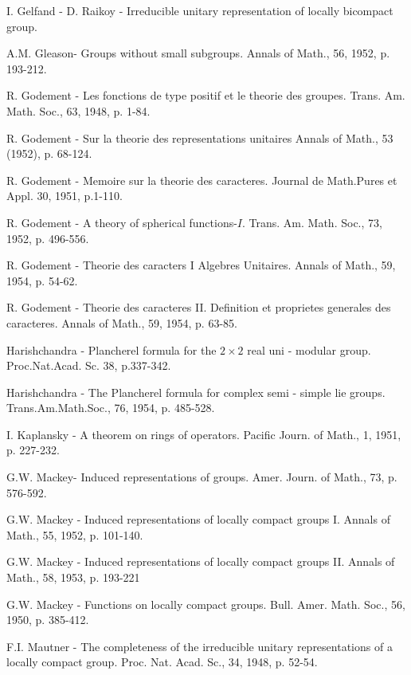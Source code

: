 \begin{thebibliography}{99}
 I. Gelfand - D. Raikoy -  Irreducible unitary representation
  of locally 
         bicompact group.

  A.M. Gleason\pageoriginale  -  Groups without small subgroups.
   Annals of Math., 56, 1952, p. 193-212.

  R. Godement  -  Les fonctions de type positif et le theorie
    des groupes.
   Trans. Am. Math. Soc., 63, 1948, p. 1-84.

 R. Godement -  Sur la theorie des representations unitaires
   Annals of Math., 53 (1952), p. 68-124.

 R. Godement -  Memoire sur la theorie des caracteres.
   Journal de Math.Pures et Appl.
  30, 1951, p.1-110.

 R. Godement -  A theory of spherical functions-$I$.
   Trans. Am. Math. Soc., 73, 1952, p. 496-556.

 R. Godement -  Theorie des caracters I Algebres Unitaires.
  Annals of Math., 59, 1954, p. 54-62.

 R. Godement -  Theorie des caracteres II. Definition et
  proprietes generales des caracteres.
  Annals of Math., 59, 1954, p. 63-85.

 Harishchandra -  Plancherel formula for the $2\times
  2$ real uni -  modular group.
    Proc.Nat.Acad. Sc. 38, p.337-342.

  Harishchandra -   The Plancherel formula for complex semi  - 
   simple lie groups.
   Trans.Am.Math.Soc., 76, 1954, p. 485-528.

 I. Kaplansky  -  A theorem on rings of operators.
    Pacific Journ. of Math., 1, 1951, p. 227-232.

 G.W. Mackey\pageoriginale  -  Induced representations
  of groups.  Amer. Journ. of Math., 73, p. 576-592.

 G.W. Mackey  -  Induced representations of locally compact
    groups I.
   Annals of Math., 55, 1952, p. 101-140.

 G.W. Mackey  -  Induced representations of locally compact
   groups II. Annals of Math., 58, 1953, p. 193-221

 G.W. Mackey -  Functions on locally compact groups.
   Bull. Amer. Math. Soc., 56, 1950, p. 385-412.

  F.I. Mautner  -  The completeness of the irreducible unitary
   representations of a locally compact group.
   Proc. Nat. Acad. Sc., 34, 1948, p. 52-54.


\end{thebibliography}
